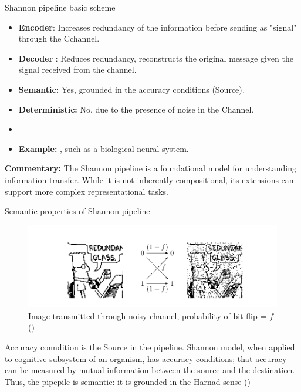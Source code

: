 \documentclass[10pt, aspectratio=169]{beamer}
\begin{document}
\begin{frame}{Shannon pipeline basic scheme}
\begin{itemize}
                    \item \textbf{Encoder}: Increases redundancy of the information before sending as "signal" through the Cchannel.
                    \item \textbf{Decoder }: Reduces redundancy, reconstructs the original message given the signal received from the channel.
                    \item \textbf{Semantic:} Yes, grounded in the accuracy conditions (Source).
                    \item \textbf{Deterministic:} No, due to the presence of noise in the Channel.
                    \item 
                    \item \textbf{Example:} , such as a biological neural system.
                \end{itemize}

                \vspace{0.5cm}
                \textbf{Commentary:} The Shannon pipeline is a foundational model for understanding information transfer. While it is not inherently compositional, its extensions can support more complex representational tasks.
        \end{frame}







\begin{frame}{ Semantic properties of Shannon pipeline }

        \begin{figure}[h!]
            \centering
            \includegraphics[width=1\linewidth]{images/Dilbert.png}
            \caption{Image transmitted through noisy channel, probability of bit flip = $f$ (\cite{MacKay2003})}
        \end{figure}
    

        Accuracy conndition is the Source in the pipeline.
        Shannon model, when applied to cognitive subsystem of an organism, has accuracy conditions; that accuracy can be measured by mutual information between the source and the destination. Thus, the pipepile  is semantic: it is grounded in the Harnad sense (\cite{harnad_symbol_1990})

\end{frame}
\end{document}
